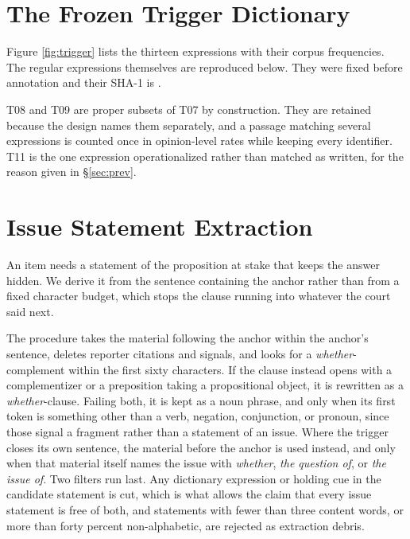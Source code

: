 

\section{The Frozen Trigger Dictionary}
\label{app:dict}

Figure \ref{fig:trigger} lists the thirteen expressions with their corpus
frequencies. The regular expressions themselves are reproduced below. They were
fixed before annotation and their SHA-1 is \texttt{\DictSHA}.



T08 and T09 are proper subsets of T07 by construction. They are retained because
the design names them separately, and a passage matching several expressions is
counted once in opinion-level rates while keeping every identifier. T11 is the
one expression operationalized rather than matched as written, for the reason
given in \S\ref{sec:prev}.

\section{Issue Statement Extraction}
\label{app:issue}

An item needs a statement of the proposition at stake that keeps the answer
hidden. We derive it from the sentence containing the anchor rather than from a
fixed character budget, which stops the clause running into whatever the court
said next.

The procedure takes the material following the anchor within the anchor's
sentence, deletes reporter citations and signals, and looks for a
\emph{whether}-complement within the first sixty characters. If the clause
instead opens with a complementizer or a preposition taking a propositional
object, it is rewritten as a \emph{whether}-clause. Failing both, it is kept as a
noun phrase, and only when its first token is something other than a verb,
negation, conjunction, or pronoun, since those signal a fragment rather than a
statement of an issue. Where the trigger closes its own sentence, the material
before the anchor is used instead, and only when that material itself names the
issue with \emph{whether}, \emph{the question of}, or \emph{the issue of}. Two
filters run last. Any dictionary expression or holding cue in the candidate
statement is cut, which is what allows the claim that every issue statement is
free of both, and statements with fewer than three content words, or more than
forty percent non-alphabetic, are rejected as extraction debris.

